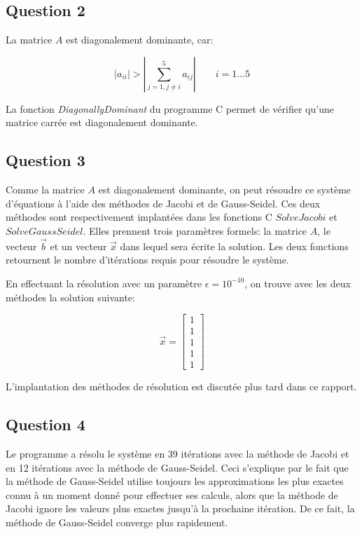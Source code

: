 \documentclass[10pt]{article}
\begin{document}
\subsection{Question 2}

La matrice $A$ est diagonalement dominante, car:

\[
|a_{ii}| > \left|\sum_{j=1, j \ne i}^5a_{ij}\right| \quad\quad i=1\ldots 5
\]

La fonction \emph{DiagonallyDominant} du programme C permet de
vérifier qu'une matrice carrée est diagonalement dominante.

\subsection{Question 3}

Comme la matrice $A$ est diagonalement dominante, on peut résoudre ce
système d'équations à l'aide des méthodes de Jacobi et de
Gauss-Seidel.  Ces deux méthodes sont respectivement implantées dans
les fonctions C $SolveJacobi$ et $SolveGaussSeidel$.  Elles prennent
trois paramètres formels: la matrice $A$, le vecteur $\vec{b}$ et un
vecteur $\vec{x}$ dans lequel sera écrite la solution.  Les deux
fonctions retournent le nombre d'itérations requis pour résoudre le
système.

En effectuant la résolution avec un paramètre $\epsilon = 10^{-10}$,
on trouve avec les deux méthodes la solution suivante:

\[
\vec{x} = \begin{bmatrix}
  1 \\ 1 \\ 1 \\ 1 \\ 1
\end{bmatrix}
\]

L'implantation des méthodes de résolution est discutée plus tard dans
ce rapport.

\subsection{Question 4}

Le programme a résolu le système en 39 itérations avec la méthode de
Jacobi et en 12 itérations avec la méthode de Gauss-Seidel.  Ceci
s'explique par le fait que la méthode de Gauss-Seidel utilise toujours
les approximations les plus exactes connu à un moment donné pour
effectuer ses calculs, alors que la méthode de Jacobi ignore les
valeurs plus exactes jusqu'à la prochaine itération. De ce fait, la
méthode de Gauss-Seidel converge plus rapidement.
\end{document}
